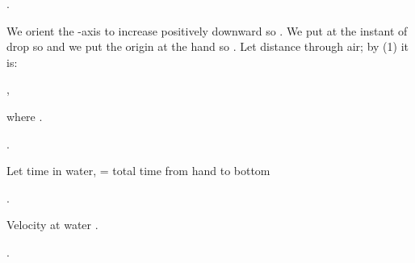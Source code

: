 {\begin{two-digit-list}
\item [8.] \NullItem
\begin{one-digit-list}
\item [a.] .
\item [  ] We orient the -axis to increase positively downward so .
           We put  at the instant of drop so  and we put
           the origin at the hand so .
           Let  distance through air; by (1) it is:
\item [  ] ,
\item [  ] where .
\item [  ] 
\item [  ] .
\item [b.] Let  time in water,  = total time from hand to
           bottom 
\item [  ] .
\item [c.] Velocity at water .
\item [d.] .
\end{one-digit-list}


\end{two-digit-list}}
